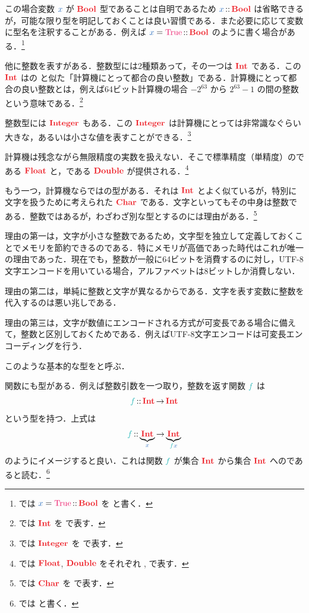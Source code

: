 \documentclass[a5paper,twoside,fleqn,draft]{jsbook}
\begin{document}
この場合変数 $\hVar{x}$ が $\hBool$ 型であることは自明であるため $\hVar{x}\hIsTypeOf\hBool$ は省略できるが，可能な限り型を明記しておくことは良い習慣である．また必要に応じて変数に型名を注釈することがある．例えば $\hVar{x}=\hTrue\hIsTypeOf\hBool$ のように書く場合がある．\footnote{\haskell では $\hVar{x}=\hTrue\hIsTypeOf\hBool$ を  と書く．}

他に整数を表すがある．整数型には2種類あって，その一つは $\hInt$ である．この $\hInt$ は\clang の  と似た「計算機にとって都合の良い整数」である．計算機にとって都合の良い整数とは，例えば64ビット計算機の場合 $-2^{63}$ から $2^{63}-1$ の間の整数という意味である．\footnote{\haskell では $\hInt$ を  で表す．}

整数型には $\hInteger$ もある．この $\hInteger$ は計算機にとっては非常識なぐらい大きな，あるいは小さな値を表すことができる．\footnote{\haskell では $\hInteger$ を  で表す．}

計算機は残念ながら無限精度の実数を扱えない．そこで標準精度（単精度）のである $\hFloat$ と，である $\hDouble$ が提供される．\footnote{\haskell では $\hFloat$, $\hDouble$ をそれぞれ ,  で表す．}

もう一つ，計算機ならではの型がある．それは $\hInt$ とよく似ているが，特別に文字を扱うために考えられた $\hChar$ である．文字といってもその中身は整数である．整数ではあるが，わざわざ別な型とするのには理由がある．\footnote{\haskell では $\hChar$ を  で表す．}

理由の第一は，文字が小さな整数であるため，文字型を独立して定義しておくことでメモリを節約できるのである．特にメモリが高価であった時代はこれが唯一の理由であった．現在でも，整数が一般に64ビットを消費するのに対し，UTF-8文字エンコードを用いている場合，アルファベットは8ビットしか消費しない．

理由の第二は，単純に整数と文字が異なるからである．文字を表す変数に整数を代入するのは悪い兆しである．

理由の第三は，文字が数値にエンコードされる方式が可変長である場合に備えて，整数と区別しておくためである．例えばUTF-8文字エンコードは可変長エンコーディングを行う．

このような基本的な型をと呼ぶ．

\separator

関数にも型がある．例えば整数引数を一つ取り，整数を返す関数 $\hFunc{f}$ は
\begin{equation}
  \hFunc{f}
  \hIsTypeOf\hInt
  \hFunctionArrow\hInt
\end{equation}
という型を持つ．上式は
\begin{equation}
  \hFunc{f}
  \hIsTypeOf\underbrace{\hInt}_{\hVar{x}}
  \hFunctionArrow\underbrace{\hInt}_{\hFunc{f}\hVar{x}}
\end{equation}
のようにイメージすると良い．これは関数 $\hFunc{f}$ が集合 $\hInt$ から集合 $\hInt$ へのであると読む．\footnote{\haskell では  と書く．}
\end{document}
